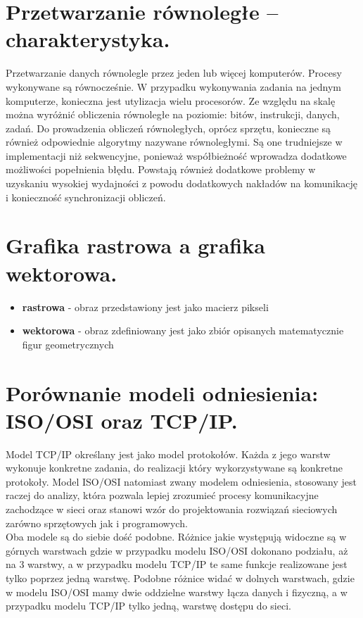 \documentclass[12pt,a4paper]{article}
\begin{document}
	\section{Przetwarzanie równoległe – charakterystyka.}
	Przetwarzanie danych równolegle przez jeden lub więcej komputerów. Procesy wykonywane są równocześnie. W przypadku wykonywania zadania na jednym komputerze, konieczna jest utylizacja wielu procesorów. Ze względu na skalę można wyróżnić obliczenia równoległe na poziomie: bitów, instrukcji, danych, zadań. Do prowadzenia obliczeń równoległych, oprócz sprzętu, konieczne są również odpowiednie algorytmy nazywane równoległymi. Są one trudniejsze w implementacji niż sekwencyjne, ponieważ współbieżność wprowadza dodatkowe możliwości popełnienia błędu. Powstają również dodatkowe problemy w uzyskaniu wysokiej wydajności z powodu dodatkowych nakładów na komunikację i konieczność synchronizacji obliczeń.

	\section{Grafika rastrowa a grafika wektorowa.}
	\begin{itemize}
		\item \textbf{rastrowa} - obraz przedstawiony jest jako macierz pikseli
		\item \textbf{wektorowa} - obraz zdefiniowany jest jako zbiór opisanych matematycznie figur geometrycznych
	\end{itemize}

	\section{Porównanie modeli odniesienia: ISO/OSI oraz TCP/IP.}
	Model TCP/IP określany jest jako model protokołów. Każda z jego warstw wykonuje konkretne zadania, do realizacji który wykorzystywane są konkretne protokoły. Model ISO/OSI natomiast zwany modelem odniesienia, stosowany jest raczej do analizy, która pozwala lepiej zrozumieć procesy komunikacyjne zachodzące w sieci oraz stanowi wzór do projektowania rozwiązań sieciowych zarówno sprzętowych jak i programowych.\\
	Oba modele są do siebie dość podobne. Różnice jakie występują widoczne są w górnych warstwach gdzie w przypadku modelu ISO/OSI dokonano podziału, aż na 3 warstwy, a w przypadku modelu TCP/IP te same funkcje realizowane jest tylko poprzez jedną warstwę. Podobne różnice widać w dolnych warstwach, gdzie w modelu ISO/OSI mamy dwie oddzielne warstwy łącza danych i fizyczną, a w przypadku modelu TCP/IP tylko jedną, warstwę dostępu do sieci.
	
\end{document}
